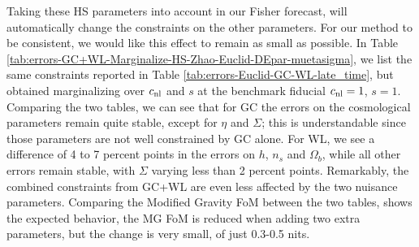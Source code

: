 Taking these HS parameters into account in our Fisher forecast, will
automatically change the constraints on the other parameters. For our
method to be consistent, we would like this effect to remain as small
as possible. In Table
\ref{tab:errors-GC+WL-Marginalize-HS-Zhao-Euclid-DEpar-muetasigma},
we list the same constraints reported in Table
\ref{tab:errors-Euclid-GC-WL-late_time},
but obtained marginalizing over $c_{\mathrm{nl}}$ and $s$ at the benchmark
fiducial $c_{\mathrm{nl}}=1$, $s=1$. Comparing the two tables, we can
see that for GC the errors on the cosmological parameters remain quite
stable, except for
$\eta$ and $\Sigma$; this is understandable since those parameters
are not well constrained by GC alone. For WL, we see a difference
of 4 to 7 percent points in the errors on $h$, $n_{s}$ and $\Omega_{b}$,
while all other errors remain stable, with $\Sigma$ varying less
than 2 percent points.
Remarkably, the combined constraints from GC+WL are even less affected by the two nuisance parameters.
Comparing the Modified Gravity FoM between the two tables, shows the expected behavior, the MG FoM is reduced
when adding two extra parameters, but the change is very small, of just 0.3-0.5 nits.

